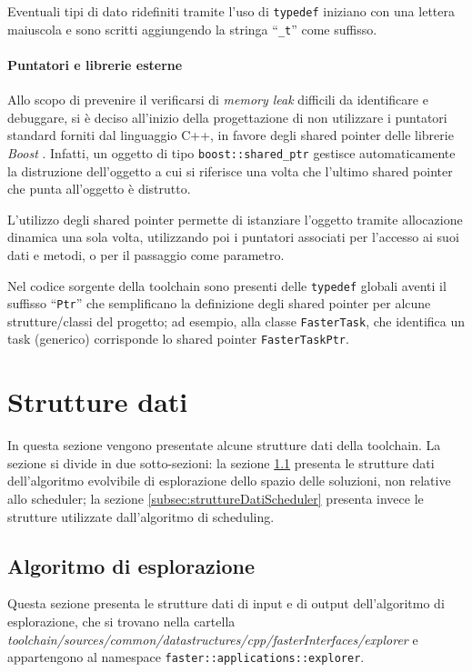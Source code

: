 Eventuali tipi di dato ridefiniti tramite l'uso di \verb+typedef+ iniziano 
con una lettera maiuscola e sono scritti aggiungendo la stringa ``\verb+_t+'' 
come suffisso.

\paragraph{Puntatori e librerie esterne}
Allo scopo di prevenire il verificarsi di \emph{memory leak} difficili da 
identificare e debuggare, si è deciso all'inizio della progettazione di non 
utilizzare i puntatori standard forniti dal linguaggio C++, in favore degli 
shared pointer delle librerie \emph{Boost} \cite{BoostLibrary, BoostSharedPtr}.
Infatti, un oggetto di tipo \verb+boost::shared_ptr+ gestisce automaticamente 
la distruzione dell'oggetto a cui si riferisce una volta che l'ultimo shared 
pointer che punta all'oggetto è distrutto.

L'utilizzo degli shared pointer permette di istanziare l'oggetto tramite 
allocazione dinamica una sola volta, utilizzando poi i puntatori associati per 
l'accesso ai suoi dati e metodi, o per il passaggio come parametro.

Nel codice sorgente della toolchain sono presenti delle \verb+typedef+ globali 
aventi il suffisso ``\verb+Ptr+'' che semplificano la definizione degli shared 
pointer per alcune strutture/classi del progetto; ad esempio, alla classe 
\verb+FasterTask+, che identifica un task (generico) corrisponde lo shared 
pointer \verb+FasterTaskPtr+.


\section{Strutture dati}
\label{sec:struttureDati}
In questa sezione vengono presentate alcune strutture dati della toolchain. La 
sezione si divide in due sotto-sezioni: la sezione 
\ref{subsec:struttureDatiMapper} presenta le strutture dati dell'algoritmo
evolvibile di esplorazione dello spazio delle soluzioni, non relative allo scheduler; la sezione 
\ref{subsec:struttureDatiScheduler} presenta invece le strutture utilizzate 
dall'algoritmo di scheduling.


\subsection{Algoritmo di esplorazione}
\label{subsec:struttureDatiMapper}
Questa sezione presenta le strutture dati di input e di output dell'algoritmo
di esplorazione, che si trovano nella cartella
\emph{toolchain/sources/common/datastructures/cpp/fasterInterfaces/explorer}
e appartengono al namespace \verb+faster::applications::explorer+.

